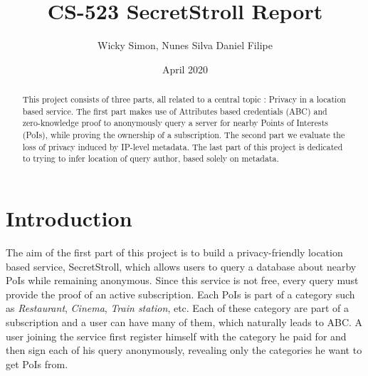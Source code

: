 \documentclass[10pt,conference,compsocconf]{IEEEtran}
\title{CS-523 SecretStroll Report}
\author{Wicky Simon, Nunes Silva Daniel Filipe}
\date{April 2020}
\begin{document}
\maketitle

\begin{abstract}
    This project consists of three parts, all related to a central topic : Privacy in a location based service.
    The first part makes use of Attributes based credentials (ABC) and zero-knowledge proof to anonymously query a server for nearby Points of Interests (PoIs), while proving the ownership of a subscription. The second part we evaluate the loss of privacy induced by IP-level metadata. The last part of this project is dedicated to trying to infer location of query author, based solely on metadata. 
\end{abstract}

\section{Introduction}

The aim of the first part of this project is to build a privacy-friendly location based service, SecretStroll, which allows users to query a database about nearby PoIs while remaining anonymous. Since this service is not free, every query must provide the proof of an active subscription. Each PoIs is part of a category such as \textit{Restaurant}, \textit{Cinema}, \textit{Train station}, etc. Each of these category are part of a subscription and a user can have many of them, which naturally leads to ABC. A user joining the service first register himself with the category he paid for and then sign each of his query anonymously, revealing only the categories he want to get PoIs from.
\end{document}
